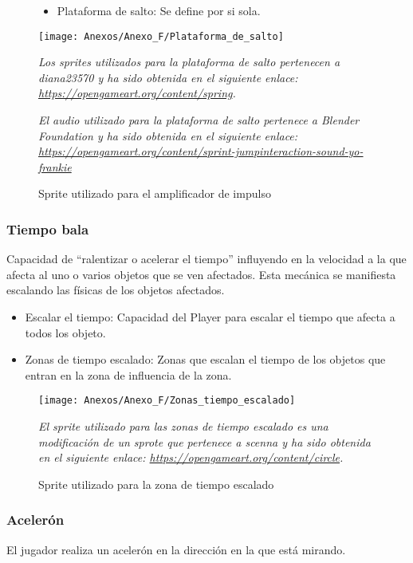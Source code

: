 \begin{figure}[h]
\begin{itemize}
\item
Plataforma de salto: Se define por si sola.
\end{itemize}
\centering
\texttt{[image: Anexos/Anexo\_F/Plataforma\_de\_salto]}
\caption{Sprite utilizado para el amplificador de impulso}
\raggedright
\textit{Los sprites utilizados para la plataforma de salto pertenecen a diana23570 y ha sido obtenida en el siguiente enlace: \url{https://opengameart.org/content/spring}.}

\textit{El audio utilizado para la plataforma de salto pertenece a Blender Foundation y ha sido obtenida en el siguiente enlace:  \url{https://opengameart.org/content/sprint-jumpinteraction-sound-yo-frankie}}
\end{figure}

\clearpage
\subsubsection{Tiempo bala}
Capacidad de “ralentizar o acelerar el tiempo” influyendo en la velocidad a la que afecta al uno o varios objetos que se ven afectados. Esta mecánica se manifiesta escalando las físicas de los objetos afectados.
\begin{itemize}
\item
Escalar el tiempo: Capacidad del Player para escalar el tiempo que afecta a todos los objeto.
\item
Zonas de tiempo escalado: Zonas que escalan el tiempo de los objetos que entran en la zona de influencia de la zona.
\end{itemize}

\begin{figure}[h]
\centering
\texttt{[image: Anexos/Anexo\_F/Zonas\_tiempo\_escalado]}
\caption{Sprite utilizado para la zona de tiempo escalado}
\raggedright
\textit{El sprite utilizado para las zonas de tiempo escalado es una modificación de un sprote que pertenece a scenna y ha sido obtenida en el siguiente enlace: \url{https://opengameart.org/content/circle}.}
\end{figure}

\subsubsection{Acelerón}
El jugador realiza un acelerón en la dirección en la que está mirando.

